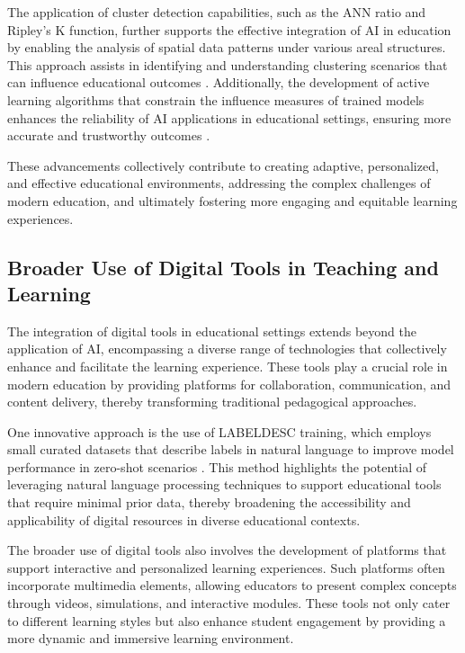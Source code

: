 The application of cluster detection capabilities, such as the ANN ratio and Ripley's K function, further supports the effective integration of AI in education by enabling the analysis of spatial data patterns under various areal structures. This approach assists in identifying and understanding clustering scenarios that can influence educational outcomes \cite{vidanapathirana2022clusterdetectioncapabilitiesaverage}. Additionally, the development of active learning algorithms that constrain the influence measures of trained models enhances the reliability of AI applications in educational settings, ensuring more accurate and trustworthy outcomes \cite{sen2018supervisingfeatureinfluence}.



These advancements collectively contribute to creating adaptive, personalized, and effective educational environments, addressing the complex challenges of modern education, and ultimately fostering more engaging and equitable learning experiences.



\subsection{Broader Use of Digital Tools in Teaching and Learning} \label{subsec:Broader Use of Digital Tools in Teaching and Learning}



The integration of digital tools in educational settings extends beyond the application of AI, encompassing a diverse range of technologies that collectively enhance and facilitate the learning experience. These tools play a crucial role in modern education by providing platforms for collaboration, communication, and content delivery, thereby transforming traditional pedagogical approaches.



One innovative approach is the use of LABELDESC training, which employs small curated datasets that describe labels in natural language to improve model performance in zero-shot scenarios \cite{gao2023benefitslabeldescriptiontrainingzeroshot}. This method highlights the potential of leveraging natural language processing techniques to support educational tools that require minimal prior data, thereby broadening the accessibility and applicability of digital resources in diverse educational contexts.



The broader use of digital tools also involves the development of platforms that support interactive and personalized learning experiences. Such platforms often incorporate multimedia elements, allowing educators to present complex concepts through videos, simulations, and interactive modules. These tools not only cater to different learning styles but also enhance student engagement by providing a more dynamic and immersive learning environment.



